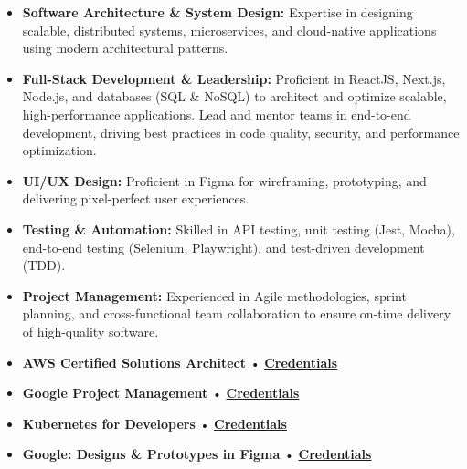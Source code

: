 \begin{itemize}
\item \textbf{Software Architecture \& System Design:} Expertise in designing scalable, distributed systems, microservices, and cloud-native applications using modern architectural patterns.
\item \textbf{Full-Stack Development \& Leadership:} Proficient in ReactJS, Next.js, Node.js, and databases (SQL \& NoSQL) to architect and optimize scalable, high-performance applications. Lead and mentor teams in end-to-end development, driving best practices in code quality, security, and performance optimization.
\item \textbf{UI/UX Design:} Proficient in Figma for wireframing, prototyping, and delivering pixel-perfect user experiences.
\item \textbf{Testing \& Automation:} Skilled in API testing, unit testing (Jest, Mocha), end-to-end testing (Selenium, Playwright), and test-driven development (TDD).
\item \textbf{Project Management:} Experienced in Agile methodologies, sprint planning, and cross-functional team collaboration to ensure on-time delivery of high-quality software.
\end{itemize}



\smallskip
\begin{itemize}
\item \textbf{AWS Certified Solutions Architect} { • } \href{https://www.dropbox.com/s/8a2mixx1nuaw0z9/CertificateOfCompletion_Learning%20Amazon%20Web%20Services%20AWS%20for%20Developers.pdf?dl=0}{\textbf{Credentials}}
\item \textbf{Google Project Management} { • } \href{https://coursera.org/share/8b4ccc5b0224c1ed696534fc9836609f}{\textbf{Credentials}}
\item \textbf{Kubernetes for Developers} { • } \href{https://www.dropbox.com/s/a0usxfusqvmeg82/CertificateOfCompletion_Learning%20Kubernetes.pdf?dl=0}{\textbf{Credentials}}
\item \textbf{Google: Designs \& Prototypes in Figma} { • } \href{https://coursera.org/share/ff30beef3bade05e80aa0b618fcfea4b}{\textbf{Credentials}}
\end{itemize}

